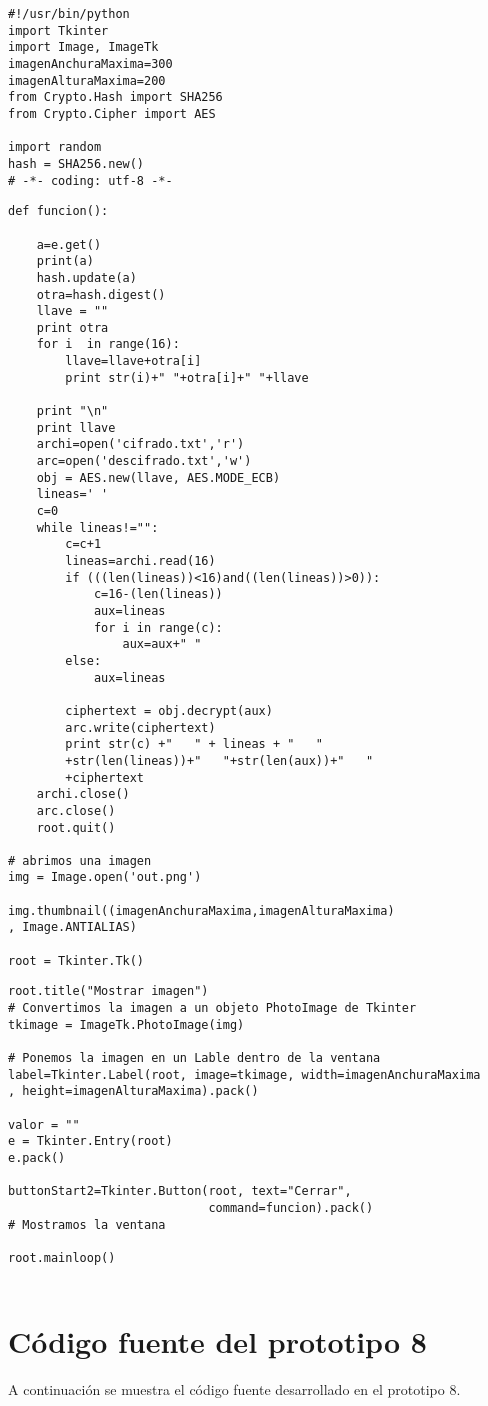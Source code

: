 \begin{lstlisting}[frame=single]
 #!/usr/bin/python
import Tkinter
import Image, ImageTk
imagenAnchuraMaxima=300
imagenAlturaMaxima=200
from Crypto.Hash import SHA256
from Crypto.Cipher import AES

import random
hash = SHA256.new()
# -*- coding: utf-8 -*-
\end{lstlisting}
\begin{lstlisting}[frame=single]
def funcion():

	a=e.get()
	print(a)
	hash.update(a)
	otra=hash.digest()
	llave = ""
	print otra
	for i  in range(16):	
		llave=llave+otra[i]
		print str(i)+" "+otra[i]+" "+llave
	
	print "\n"
	print llave
	archi=open('cifrado.txt','r')
	arc=open('descifrado.txt','w')
	obj = AES.new(llave, AES.MODE_ECB)
	lineas=' '
	c=0
	while lineas!="": 
		c=c+1
		lineas=archi.read(16)	
		if (((len(lineas))<16)and((len(lineas))>0)):
			c=16-(len(lineas))
			aux=lineas
			for i in range(c):
				aux=aux+" "
		else:
			aux=lineas
	
		ciphertext = obj.decrypt(aux)
		arc.write(ciphertext)
		print str(c) +"   " + lineas + "   "
		+str(len(lineas))+"   "+str(len(aux))+"   "
		+ciphertext
	archi.close()
	arc.close()
	root.quit()

# abrimos una imagen
img = Image.open('out.png')

img.thumbnail((imagenAnchuraMaxima,imagenAlturaMaxima)
, Image.ANTIALIAS)

root = Tkinter.Tk()
\end{lstlisting}
\begin{lstlisting}[frame=single]
root.title("Mostrar imagen")
# Convertimos la imagen a un objeto PhotoImage de Tkinter
tkimage = ImageTk.PhotoImage(img)

# Ponemos la imagen en un Lable dentro de la ventana
label=Tkinter.Label(root, image=tkimage, width=imagenAnchuraMaxima
, height=imagenAlturaMaxima).pack()

valor = ""
e = Tkinter.Entry(root)
e.pack()

buttonStart2=Tkinter.Button(root, text="Cerrar",
                            command=funcion).pack()
# Mostramos la ventana

root.mainloop()


\end{lstlisting}

\chapter{Código fuente del prototipo 8}
\label{Anexos B}
A continuación se muestra el código fuente desarrollado en el prototipo 8.

